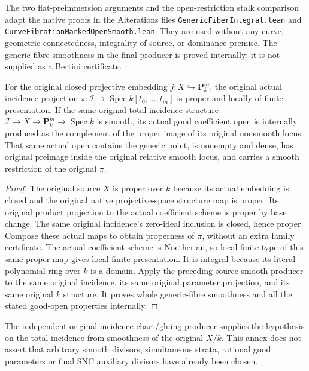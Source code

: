 The two flat-preimmersion arguments and the open-restriction stalk comparison
adapt the native proofs in the Alterations files
\texttt{GenericFiberIntegral.lean} and
\texttt{CurveFibrationMarkedOpenSmooth.lean}.  They are used without any
curve, geometric-connectedness, integrality-of-source, or dominance premise.
The generic-fibre smoothness in the final producer is proved internally;
it is not supplied as a Bertini certificate.


\begin{lemma}
\label{lem:kn-nadel-bertini-projective-good-open}
\leanok
For the original closed projective embedding $j:X\hookrightarrow\mathbf P^m_k$,
the original actual incidence projection $\pi:\mathcal I\to
\operatorname{Spec}k[t_0,\ldots,t_m]$ is proper and locally of finite
presentation.  If the same original total incidence structure
$\mathcal I\to X\to\mathbf P^m_k\to\operatorname{Spec}k$ is smooth, its
actual good coefficient open is internally produced as the complement of
the proper image of its original nonsmooth locus.  That same actual open
contains the generic point, is nonempty and dense, has original preimage
inside the original relative smooth locus, and carries a smooth restriction
of the original $\pi$.
\end{lemma}
\begin{proof}
The original source $X$ is proper over $k$ because its actual embedding is
closed and the original native projective-space structure map is proper.
Its original product projection to the actual coefficient scheme is proper
by base change.  The same original incidence's zero-ideal inclusion is
closed, hence proper.  Compose these actual maps to obtain properness of
$\pi$, without an extra family certificate.  The actual coefficient scheme
is Noetherian, so local finite type of this same proper map gives local
finite presentation.  It is integral because its literal polynomial ring
over $k$ is a domain.  Apply the preceding source-smooth producer to the
same original incidence, its same original parameter projection, and its
same original $k$ structure.  It proves whole generic-fibre smoothness and
all the stated good-open properties internally.
\end{proof}

The independent original incidence-chart/gluing producer supplies the
hypothesis on the total incidence from smoothness of the original $X/k$.
This annex does not assert that arbitrary smooth divisors, simultaneous
strata, rational good parameters or final SNC auxiliary divisors have
already been chosen.
